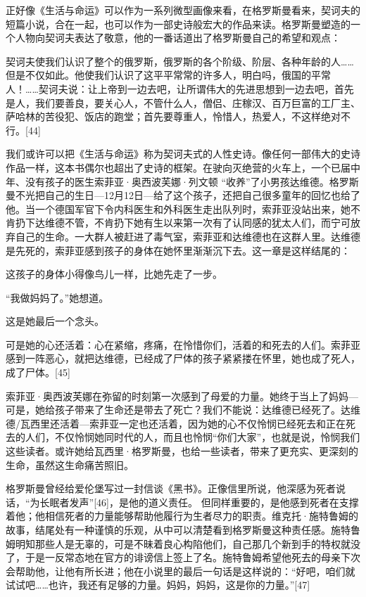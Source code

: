 正好像《生活与命运》可以作为一系列微型画像来看，在格罗斯曼看来，契诃夫的短篇小说，合在一起，也可以作为一部史诗般宏大的作品来读。格罗斯曼塑造的一个人物向契诃夫表达了敬意，他的一番话道出了格罗斯曼自己的希望和观点：

契诃夫使我们认识了整个的俄罗斯，俄罗斯的各个阶级、阶层、各种年龄的人……但是不仅如此。他使我们认识了这平平常常的许多人，明白吗，俄国的平常人！……契诃夫说：让上帝到一边去吧，让所谓伟大的先进思想到一边去吧，首先是人，我们要善良，要关心人，不管什么人，僧侣、庄稼汉、百万巨富的工厂主、萨哈林的苦役犯、饭店的跑堂；首先要尊重人，怜惜人，热爱人，不这样绝对不行。[44]

我们或许可以把《生活与命运》称为契诃夫式的人性史诗。像任何一部伟大的史诗作品一样，这本书偶尔也超出了史诗的框架。在驶向灭绝营的火车上，一个已届中年、没有孩子的医生索菲亚·奥西波芙娜·列文顿 “收养”了小男孩达维德。格罗斯曼不光把自己的生日—12月12日—给了这个孩子，还把自己很多童年的回忆也给了他。当一个德国军官下令内科医生和外科医生走出队列时，索菲亚没站出来，她不肯扔下达维德不管，不肯扔下她有生以来第一次有了认同感的犹太人们，而宁可放弃自己的生命。一大群人被赶进了毒气室，索菲亚和达维德也在这群人里。达维德是先死的，索菲亚感到孩子的身体在她怀里渐渐沉下去。这一章是这样结尾的：

这孩子的身体小得像鸟儿一样，比她先走了一步。

“我做妈妈了。”她想道。

这是她最后一个念头。

可是她的心还活着：心在紧缩，疼痛，在怜惜你们，活着的和死去的人们。索菲亚感到一阵恶心，就把达维德，已经成了尸体的孩子紧紧搂在怀里，她也成了死人，成了尸体。[45]

索菲亚·奥西波芙娜在弥留的时刻第一次感到了母爱的力量。她终于当上了妈妈—可是，她给孩子带来了生命还是带去了死亡？我们不能说：达维德已经死了。达维德/瓦西里还活着—索菲亚一定也还活着，因为她的心不仅怜悯已经死去和正在死去的人们，不仅怜悯她同时代的人，而且也怜悯“你们大家”，也就是说，怜悯我们这些读者。或许她给瓦西里·格罗斯曼，也给一些读者，带来了更充实、更深刻的生命，虽然这生命痛苦照旧。

格罗斯曼曾经给爱伦堡写过一封信谈《黑书》。正像信里所说，他深感为死者说话，“为长眠者发声”[46]，是他的道义责任。 但同样重要的，是他感到死者在支撑着他；他相信死者的力量能够帮助他履行为生者尽力的职责。维克托·施特鲁姆的故事，结尾处有一种谨慎的乐观，从中可以清楚看到格罗斯曼这种责任感。施特鲁姆明知那些人是无辜的，可是不昧着良心构陷他们，自己那几个新到手的特权就没了，于是一反常态地在官方的诽谤信上签上了名。施特鲁姆希望他死去的母亲下次会帮助他，让他有所长进；他在小说里的最后一句话是这样说的：“好吧，咱们就试试吧……也许，我还有足够的力量。妈妈，妈妈，这是你的力量。”[47]

